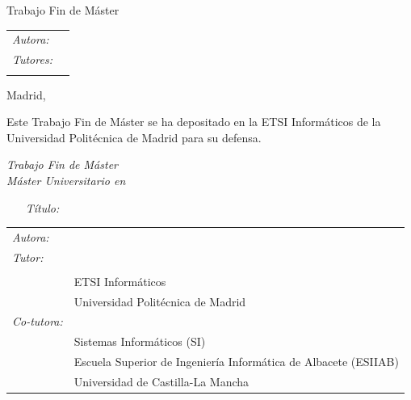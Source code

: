 \begin{titlepage}
\vspace*{1cm}
\begin{center}
\huge{ Trabajo Fin de Máster }
\end{center}

\vspace*{0.5cm}
\begin{center}
\huge\bfseries {  \TituloTFM{} } 
\end{center}

\vspace*{5cm}

\noindent
\begin{tabular}{ll}
\Large{\textit{Autora:}} & \Large{\NombreAutor{}} \\
\Large{\textit{Tutores:}} & \Large{\NombreTutor{}}  \\ 
 & \Large{\NombreCoTutor{}}
\end{tabular} 

\vspace*{4cm}
\begin{center}
Madrid, \Fecha
\end{center}

\newpage
\thispagestyle{empty}
\noindent
Este Trabajo Fin de Máster se ha depositado en la ETSI Informáticos de la Universidad Politécnica de Madrid para su defensa.

\vspace*{4cm}
\noindent
\textit{Trabajo Fin de Máster}\\
\textit{Máster Universitario en} \Master{}

\begin{enumerate}
\item[\textit{Título:}] \TituloTFM{}
\end{enumerate}
\Fecha


\vspace*{3cm}

\noindent
\begin{tabular}{ll}
\textit{Autora:} & \NombreAutor{}  \\ 
\textit{Tutor:} & \NombreTutor{}  \\ 
                & \Departamento{} \\
                & ETSI Informáticos\\
                & Universidad Politécnica de Madrid\\
\textit{Co-tutora:} & \NombreCoTutor{} \\
					  & Sistemas Informáticos (SI)\\
					  & Escuela Superior de Ingeniería Informática de Albacete (ESIIAB)\\
					  & Universidad de Castilla-La Mancha
\end{tabular} 

\end{titlepage}
